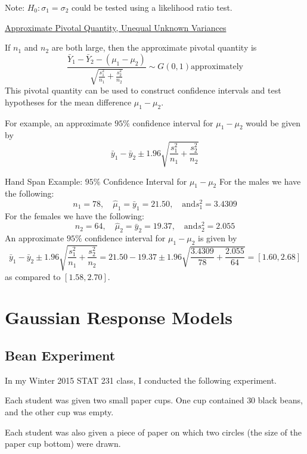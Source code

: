 Note: $ H_0:\sigma_1=\sigma_2 $ could be tested using a likelihood ratio test.

\underline{Approximate Pivotal Quantity, Unequal Unknown Variances}

If $ n_1 $ and $ n_2 $ are both large, then the approximate pivotal quantity is
\[\frac{\bar{Y}_{1}-\bar{Y}_{2}-\left(\mu_{1}-\mu_{2}\right)}{\sqrt{\frac{s_{1}^{2}}{n_{1}}+\frac{s_{2}^{2}}{n_{2}}}} \sim G(0,1) \text{approximately}\]
This pivotal quantity can be used to construct confidence intervals and test hypotheses for the
mean difference $ \mu_1-\mu_2 $.


\begin{Example}{}{}
    For example, an approximate $ 95\% $ confidence interval for $ \mu_1-\mu_2 $ would be given
    by
    \[\bar{y}_{1}-\bar{y}_{2} \pm 1.96 \sqrt{\frac{s_{1}^{2}}{n_{1}}+\frac{s_{2}^{2}}{n_{2}}}\]
\end{Example}



\begin{Example}{Hand Span Example: $ 95\% $ Confidence Interval for $ \mu_1-\mu_2 $}{}
    For the males we have the following:
    \[n_{1}=78, \quad \hat{\mu}_{1}=\bar{y}_{1}=21.50, \quad \text{and} s_{1}^{2}=3.4309\]
    For the females we have the following:
    \[n_{2}=64, \quad \hat{\mu}_{2}=\bar{y}_{2}=19.37, \quad \text{and} s_{2}^{2}=2.055\]
    An approximate $ 95\% $ confidence interval for $ \mu_1-\mu_2 $ is given by
    \[\bar{y}_{1}-\bar{y}_{2} \pm 1.96 \sqrt{\frac{s_{1}^{2}}{n_{1}}+\frac{s_{2}^{2}}{n_{2}}}=21.50-19.37 \pm 1.96 \sqrt{\frac{3.4309}{78}+\frac{2.055}{64}}=[1.60,2.68]\]
    as compared to $ [1.58,2.70] $.
\end{Example}


\section{Gaussian Response Models}
\subsection{Bean Experiment}
In my Winter 2015 STAT 231 class, I conducted the following experiment.

Each student was given two small paper cups. One cup contained $30$ black beans, and
the other cup was empty.

Each student was also given a piece of paper on which two circles
(the size of the paper cup bottom) were drawn.

